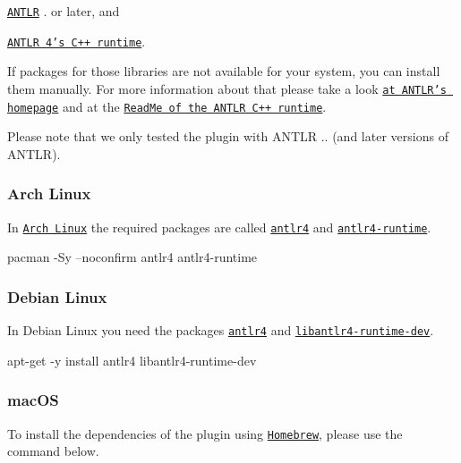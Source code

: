 \begin{DoxyItemize}
\item \href{https://www.antlr.org}{\tt A\+N\+T\+LR} {.} or later, and
\item \href{https://github.com/antlr/antlr4/tree/master/runtime/Cpp}{\tt A\+N\+T\+LR 4’s C++ runtime}.
\end{DoxyItemize}

If packages for those libraries are not available for your system, you can install them manually. For more information about that please take a look \href{https://www.antlr.org}{\tt at A\+N\+T\+L\+R’s homepage} and at the \href{https://github.com/antlr/antlr4/tree/master/runtime/Cpp}{\tt Read\+Me of the A\+N\+T\+LR C++ runtime}.

Please note that we only tested the plugin with A\+N\+T\+LR {..} (and later versions of A\+N\+T\+LR).\hypertarget{autotoc_md897_autotoc_md900}{}\subsubsection{Arch Linux}\label{autotoc_md897_autotoc_md900}
In \href{https://www.archlinux.org/}{\tt Arch Linux} the required packages are called \href{https://www.archlinux.org/packages/extra/any/antlr4/}{\tt {\ttfamily antlr4}} and \href{https://www.archlinux.org/packages/community/x86_64/antlr4-runtime/}{\tt {\ttfamily antlr4-\/runtime}}.


\begin{DoxyCode}
pacman -Sy --noconfirm antlr4 antlr4-runtime
\end{DoxyCode}
\hypertarget{autotoc_md897_autotoc_md901}{}\subsubsection{Debian Linux}\label{autotoc_md897_autotoc_md901}
In Debian Linux you need the packages \href{https://packages.debian.org/sid/antlr4}{\tt {\ttfamily antlr4}} and \href{https://packages.debian.org/sid/libantlr4-runtime-dev}{\tt {\ttfamily libantlr4-\/runtime-\/dev}}.


\begin{DoxyCode}
apt-get -y install antlr4 libantlr4-runtime-dev
\end{DoxyCode}
\hypertarget{autotoc_md897_autotoc_md902}{}\subsubsection{mac\+OS}\label{autotoc_md897_autotoc_md902}
To install the dependencies of the plugin using \href{https://brew.sh}{\tt Homebrew}, please use the command below.


